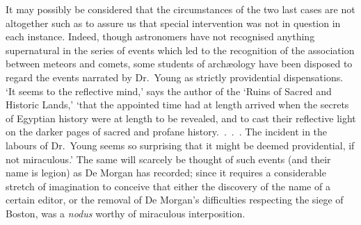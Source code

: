 \documentclass[letterpaper,12pt,oneside,openany]{memoir}
\begin{document}
It may possibly be considered that the circumstances
of the two last cases are not altogether such as to
assure us that special intervention was not in question
in each instance. Indeed, though astronomers have
not recognised anything supernatural in the series of
events which led to the recognition of the association
between meteors and comets, some students of arch{\ae}ology
have been disposed to regard the events narrated
by Dr.~Young as strictly providential dispensations.
`It seems to the reflective mind,' says the author of
the `Ruins of Sacred and Historic Lands,' `that the
appointed time had at length arrived when the secrets
of Egyptian history were at length to be revealed, and
to cast their reflective light on the darker pages of
sacred and profane history.~.~.~. The incident in the
labours of Dr.~Young seems so surprising that it might
be deemed providential, if not miraculous.' The same
will scarcely be thought of such events (and their
name is legion) as De Morgan has recorded; since it
requires a considerable stretch of imagination to conceive
that either the discovery of the name of a certain
editor, or the removal of De Morgan's difficulties
respecting the siege of Boston, was a \textit{nodus} worthy of
miraculous interposition.
\end{document}

